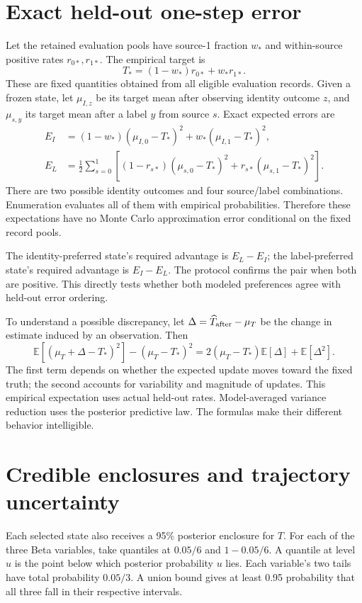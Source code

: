 \documentclass[11pt,a4paper]{report}
\newcommand{\E}{\mathbb E}
\begin{document}
\section{Exact held-out one-step error}
Let the retained evaluation pools have source-1 fraction $w_*$ and within-source positive rates $r_{0*},r_{1*}$. The empirical target is
\begin{equation}
T_*=(1-w_*)r_{0*}+w_*r_{1*}.
\end{equation}
These are fixed quantities obtained from all eligible evaluation records. Given a frozen state, let $\mu_{I,z}$ be its target mean after observing identity outcome $z$, and $\mu_{s,y}$ its target mean after a label $y$ from source $s$. Exact expected errors are
\begin{align}
E_I&=(1-w_*)(\mu_{I,0}-T_*)^2+w_*(\mu_{I,1}-T_*)^2,\\
E_L&=\tfrac12\sum_{s=0}^1\left[(1-r_{s*})(\mu_{s,0}-T_*)^2
+r_{s*}(\mu_{s,1}-T_*)^2\right].
\label{eq:heldout}
\end{align}
There are two possible identity outcomes and four source/label combinations. Enumeration evaluates all of them with empirical probabilities. Therefore these expectations have no Monte Carlo approximation error conditional on the fixed record pools.

The identity-preferred state's required advantage is $E_L-E_I$; the label-preferred state's required advantage is $E_I-E_L$. The protocol confirms the pair when both are positive. This directly tests whether both modeled preferences agree with held-out error ordering.

To understand a possible discrepancy, let $\Delta=\widehat T_{\rm after}-\mu_T$ be the change in estimate induced by an observation. Then
\begin{equation}
\E[(\mu_T+\Delta-T_*)^2]-(\mu_T-T_*)^2
=2(\mu_T-T_*)\E[\Delta]+\E[\Delta^2].
\label{eq:changeerror}
\end{equation}
The first term depends on whether the expected update moves toward the fixed truth; the second accounts for variability and magnitude of updates. This empirical expectation uses actual held-out rates. Model-averaged variance reduction uses the posterior predictive law. The formulas make their different behavior intelligible.

\section{Credible enclosures and trajectory uncertainty}
Each selected state also receives a 95\% posterior enclosure for $T$. For each of the three Beta variables, take quantiles at $0.05/6$ and $1-0.05/6$. A quantile at level $u$ is the point below which posterior probability $u$ lies. Each variable's two tails have total probability $0.05/3$. A union bound gives at least 0.95 probability that all three fall in their respective intervals.
\end{document}
